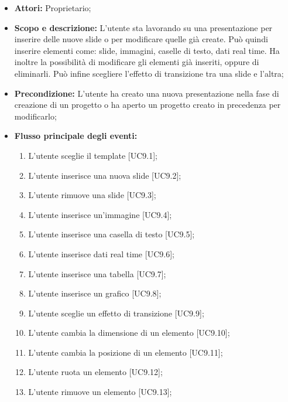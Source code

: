\begin{itemize}
	\item \textbf{Attori:} Proprietario;
	\item \textbf{Scopo e descrizione:} L'utente sta lavorando su una presentazione per inserire delle nuove \gls{slide} o per modificare quelle già create. Può quindi inserire  elementi come: \gls{slide}, immagini, caselle di testo, dati \gls{real time}. Ha inoltre la possibilità di modificare gli elementi già inseriti, oppure di eliminarli. Può infine scegliere l'effetto di transizione tra una \gls{slide} e l'altra;
	\item \textbf{Precondizione:} L'utente ha creato una nuova presentazione nella fase di creazione di un progetto o ha aperto un progetto creato in precedenza per modificarlo;
	\item \textbf{Flusso principale degli eventi:}
	\begin{enumerate}
		\item L'utente sceglie il \gls{template} [UC9.1];
		
		\item L'utente inserisce una nuova \gls{slide} [UC9.2];
		
		\item L'utente rimuove una \gls{slide} [UC9.3];
		
		\item L'utente inserisce un'immagine [UC9.4];
		
		\item L'utente inserisce una casella di testo [UC9.5];
		
		\item L'utente inserisce dati \gls{real time} [UC9.6];
		
		\item L'utente inserisce una tabella [UC9.7];
		
		\item L'utente inserisce un grafico [UC9.8];
		
		\item L'utente sceglie un effetto di transizione [UC9.9];
		
		\item L'utente cambia la dimensione di un elemento [UC9.10];
		
		\item L'utente cambia la posizione di un elemento [UC9.11];
		
		\item L'utente ruota un elemento [UC9.12];
		
		\item L'utente rimuove un elemento [UC9.13];


\end{enumerate}
\end{itemize}
